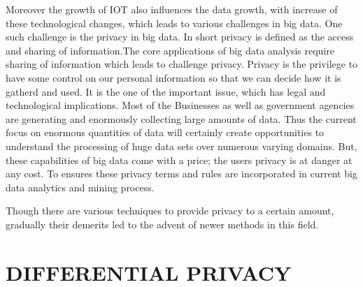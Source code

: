 \documentclass[10pt,a4paper,journal]{IEEEtran}
\begin{document}
\hspace{2em} Moreover the growth of IOT also influences the data growth, with increase of these technological changes, which leads to various challenges in big data. One such challenge is the privacy in big data\cite{7}. In short privacy is defined as the access and sharing of information.The core  applications of big data analysis require sharing of information which leads to challenge privacy. Privacy is the privilege to have some control on our personal information so that we can decide how it is gatherd and used. It is the one of the important issue, which has legal and technological implications. Most of the Businesses as well as government agencies are generating and enormously collecting large amounts of data\cite{15}. Thus the current focus on enormous quantities of data will certainly create opportunities to understand the processing of huge data sets  over numerous varying domains\cite{8}. But, these capabilities of big data come with a price; the users privacy is at danger at any cost. To ensures these privacy terms and rules are incorporated in current big data analytics and mining process. 
 

\hspace{2em} Though there are various techniques to provide privacy to a certain amount, gradually their demerits led to the advent of newer methods in this field.

\section{DIFFERENTIAL PRIVACY}
\end{document}
